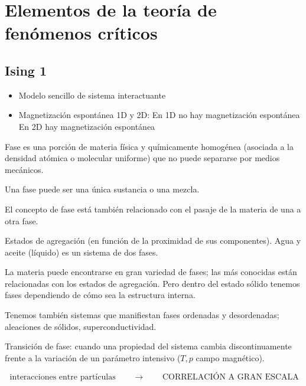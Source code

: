 \documentclass[10pt,oneside]{CBFT_book}
\begin{document}
\chapter{Elementos de la teoría de fenómenos críticos}


\section{Ising 1}

\begin{itemize}
 \item Modelo sencillo de sistema interactuante
 \item Magnetización espontánea 1D y 2D:
 \subitem En 1D no hay magnetización espontánea
 \subitem En 2D hay magnetización espontánea
\end{itemize}

Fase es una porción de materia física y químicamente homogénea (asociada a la densidad atómica o molecular
uniforme) que no puede separarse por medios mecánicos.

Una fase puede ser una única sustancia o una mezcla.

El concepto de fase está también relacionado con el pasaje de la materia de una a otra fase.


Estados de agregación (en función de la proximidad de sus componentes). Agua y aceite (líquido) es un sistema de dos 
fases.

La materia puede encontrarse en gran variedad de fases; las más conocidas están relacionadas con los estados de 
agregación. Pero dentro del estado sólido tenemos fases dependiendo de cómo sea la estructura interna.

Tenemos también sistemas que manifiestan fases ordenadas y desordenadas; aleaciones de sólidos, superconductividad.

Transición de fase: cuando una propiedad del sistema cambia discontinuamente frente a la variación de un parámetro 
intensivo ($T, p$ campo magnético).

\[
	\text{ interacciones entre partículas } \qquad \rightarrow \qquad \text{ CORRELACIÓN A GRAN ESCALA }  
\]
\end{document}

